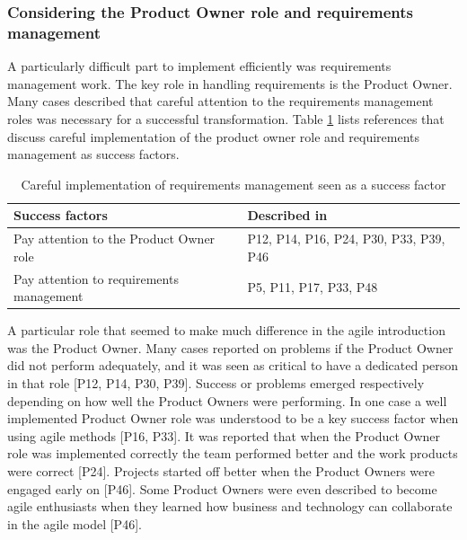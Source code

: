 \documentclass[preprint,authoryear,12pt]{elsarticle}
\begin{document}
\subsubsection{Considering the Product Owner role and requirements management}

A particularly difficult part to implement efficiently was requirements
management work. The key role in handling requirements is the Product Owner.
Many cases described that careful attention to the requirements management roles
was necessary for a successful transformation.
Table \ref{table:success_requirements} lists references that discuss careful
implementation of the product owner role and requirements management as success
factors.

\begin{table}[h]
    \centering
    \begin{tabular}{ >{\raggedright\arraybackslash}p{}
                     >{\raggedright\arraybackslash}p{} }
        \toprule
        Success factors  &  Described in \\
        \midrule
        Pay attention to the Product Owner role  &
                P12, P14, P16, P24, P30, P33, P39, P46  \\
        Pay attention to requirements management  &
                P5, P11, P17, P33, P48  \\
        \bottomrule
    \end{tabular}
    \caption{Careful implementation of requirements management seen as a
             success factor}
    \label{table:success_requirements}
\end{table}


A particular role that seemed to make much difference in the agile introduction
was the Product Owner. Many cases reported on problems if the Product Owner did
not perform adequately, and it was seen as critical to have a dedicated person
in that role [P12, P14, P30, P39].
Success or problems emerged respectively depending on how well the Product
Owners were performing. In one case a well implemented Product Owner role was
understood to be a key success factor when using agile methods [P16, P33].
It was reported that when the Product Owner role was implemented correctly the
team performed better and the work products were correct [P24]. Projects started
off better when the Product Owners were engaged early on [P46]. Some Product
Owners were even described to become agile enthusiasts when they learned how
business and technology can collaborate in the agile model [P46].
\end{document}
